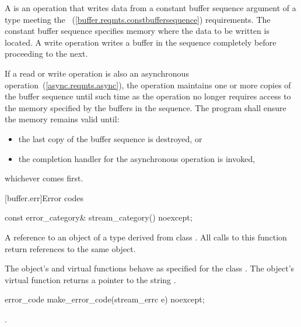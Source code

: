 \pnum
A  is an operation that writes data from a constant buffer sequence argument of a type meeting the ~(\ref{buffer.reqmts.constbuffersequence}) requirements. The constant buffer sequence specifies memory where the data to be written is located. A write operation writes a buffer in the sequence completely before proceeding to the next.

%
\pnum
If a read or write operation is also an asynchronous operation~(\ref{async.reqmts.async}), the operation maintains one or more copies of the buffer sequence until such time as the operation no longer requires access to the memory specified by the buffers in the sequence. The program shall ensure the memory remains valid until:

\begin{itemize}
\item the last copy of the buffer sequence is destroyed, or
\item the completion handler for the asynchronous operation is invoked,
\end{itemize}

whichever comes first.




%
[buffer.err]{Error codes}

%
\begin{itemdecl}
const error_category& stream_category() noexcept;
\end{itemdecl}

\begin{itemdescr}
\pnum
\returns A reference to an object of a type derived from class . All calls to this function return references to the same object.

\pnum
The object's  and  virtual functions behave as specified for the class . The object's  virtual function returns a pointer to the string .
\end{itemdescr}

%
\begin{itemdecl}
error_code make_error_code(stream_errc e) noexcept;
\end{itemdecl}

\begin{itemdescr}
\pnum
\returns {}.
\end{itemdescr}

